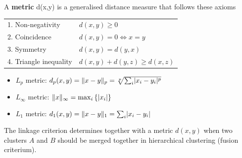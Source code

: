 \documentclass[11pt]{article}
\theoremstyle{definition}
\DeclarePairedDelimiter\abs{\lvert}{\rvert}
\DeclarePairedDelimiter\norm{\lVert}{\rVert}
\begin{document}
\vspace{1em}
\noindent
A \textbf{metric} d(x,y) is a generalised distance measure that follows these axioms
\begin{tabularx}{\linewidth}{l X}
	1. Non-negativity & $d(x,y)\geq 0$\\
	2. Coincidence & $d(x,y) = 0 \Leftrightarrow x=y$\\
	3. Symmetry & $d(x,y) = d(y,x)$\\
	4. Triangle inequality & $d(x,y) + d(y,z) \geq d(x,z)$
\end{tabularx}
\begin{itemize}
	\item $L_p$ metric: \quad $d_p(x,y) = \norm{x-y}_p = \sqrt[p]{\sum_i \abs{x_i - y_i}^p}$
	\item $L_\infty$ metric: \quad $\norm{x}_\infty = \max_i\left\{\abs{x_i}\right\}$
	\item $L_1$ metric: \quad $d_1(x,y) = \norm{x-y}_1 = \sum_i\abs{x_i - y_i}$
\end{itemize}
\clearpage
The linkage criterion determines together with a metric $d(x,y)$ when two clusters $A$ and $B$ should be merged together in hierarchical clustering (fusion criterium).
\end{document}
